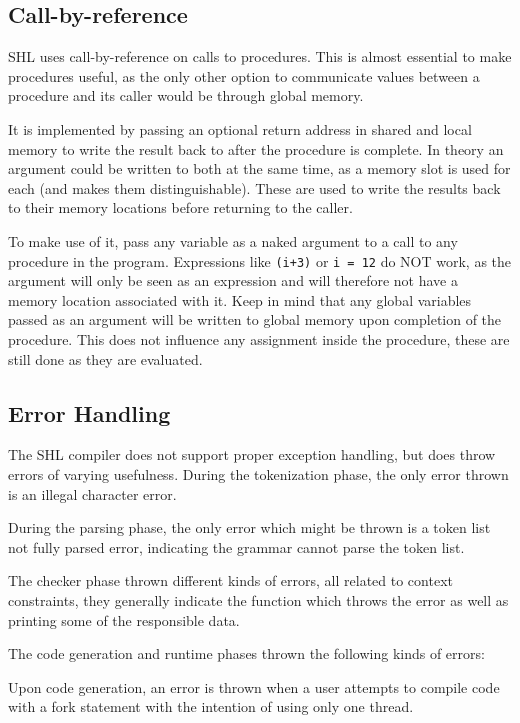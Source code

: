 \documentclass[twoside]{report}
\begin{document}
\subsection{Call-by-reference}
\label{def:call-by-reference}
SHL uses call-by-reference on calls to procedures. This is almost essential to make procedures useful, as the only other option to communicate values between a procedure and its caller would be through global memory. 

It is implemented by passing an optional return address in shared and local memory to write the result back to after the procedure is complete. In theory an argument could be written to both at the same time, as a memory slot is used for each (and makes them distinguishable). These are used to write the results back to their memory locations before returning to the caller.


To make use of it, pass any variable as a naked argument to a call to any procedure in the program. Expressions like \texttt{(i+3)} or \texttt{i = 12} do NOT work, as the argument will only be seen as an expression and will therefore not have a memory location associated with it. Keep in mind that any global variables passed as an argument will be written to global memory upon completion of the procedure. This does not influence any assignment inside the procedure, these are still done as they are evaluated.


\subsection{Error Handling}
\label{def:error_handling}
The SHL compiler does not support proper exception handling, but does throw errors of varying usefulness. During the tokenization phase, the only error thrown is an illegal character error.

During the parsing phase, the only error which might be thrown is a token list not fully parsed error, indicating the grammar cannot parse the token list.

The checker phase thrown different kinds of errors, all related to context constraints, they generally indicate the function which throws the error as well as printing some of the responsible data.

The code generation and runtime phases thrown the following kinds of errors:

Upon code generation, an error is thrown when a user attempts to compile code with a fork statement with the intention of using only one thread.
\end{document}
